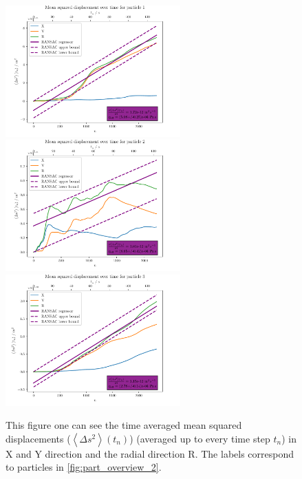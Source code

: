 \documentclass[12pt,english]{scrartcl}
\begin{document}
\begin{figure}[H]
	\centering
	\includegraphics[width=0.6\textwidth]{figures/I2_particle_1.pdf}
	\includegraphics[width=0.6\textwidth]{figures/I2_particle_2.pdf}
	\includegraphics[width=0.6\textwidth]{figures/I2_particle_3.pdf}
	\caption[Time averaged mean squared displacements from the particles of the second
		capture]{This figure one can see the time averaged mean squared displacements
		($\left\langle \Delta s^2 \right\rangle(t_n)$) (averaged up to every time step
		$t_n$) in X and Y direction and the radial direction R. The labels correspond
		to particles in \autoref{fig:part_overview_2}.
	}\label{fig:part_second}
\end{figure}
\end{document}
